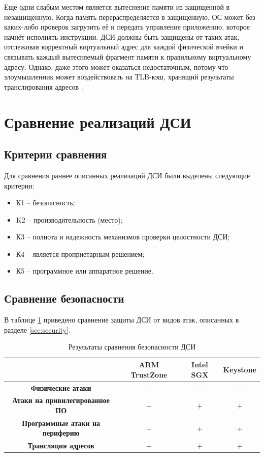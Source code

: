 Ещё одни слабым местом является вытеснение памяти из защищенной в незащищенную. Когда память перераспределяется в защищенную, ОС может без каких-либо проверок загрузить её и передать управление приложению, которое начнёт исполнять инструкции. ДСИ должны быть защищены от таких атак, отслеживая корректный виртуальный адрес для каждой физической ячейки и связывать каждый вытесняемый фрагмент памяти к правильному виртуальному адресу. Однако, даже этого может оказаться недостаточным, потому что злоумышленник может воздействовать на TLB-кэш, хранящий результаты транслирования адресов \cite{attack-on-chip}.

\section{Сравнение реализаций ДСИ}

\subsection{Критерии сравнения}

Для сравнения раннее описанных реализаций ДСИ были выделены следующие критерии:

\begin{itemize}
	\item К1 -- безопасность;
	\item K2 -- производительность (место);
	\item К3 -- полнота и надежность механизмов проверки целостности ДСИ;
	\item К4 -- является проприетарным решением;
	\item К5 -- программное или аппаратное решение.
\end{itemize}

\subsection{Сравнение безопасности}

В таблице \ref{table:security-features} приведено сравнение защиты ДСИ от видов атак, описанных в разделе \ref{sec:security}.

\begin{table}[!htb]
	\begin{center}
		\caption{Результаты сравнения безопасности ДСИ}
		\label{table:security-features}
		\begin{tabular}{|c|c|c|c|}
			\hline
			& \bfseries ARM TrustZone & \bfseries Intel SGX & \bfseries Keystone \\
			\hline
			\bfseries Физические атаки & - & - & - \\ \hline
			\bfseries Атаки на привилегированное ПО & + & + & + \\ \hline
			\bfseries Программные атаки на периферию & + & + & + \\ \hline	
			\bfseries Трансляция адресов & + & + & + \\ \hline	
		\end{tabular}
	\end{center}
\end{table}

